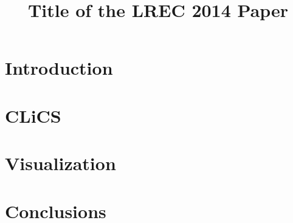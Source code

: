 \documentclass[10pt, a4paper]{article}
\title{Title of the LREC 2014 Paper}
\begin{document}
\maketitleabstract

\section{Introduction}

\section{CLiCS}



\section{Visualization}



\section{Conclusions}






\end{document}
